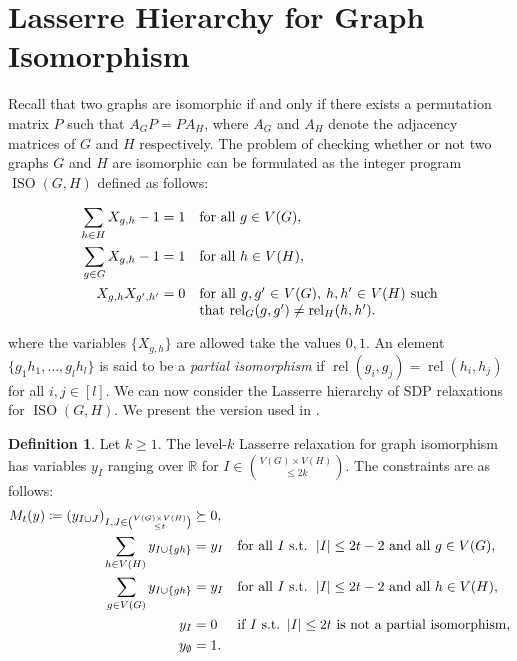 \documentclass[11pt,a4paper]{article}
\theoremstyle{plain}
\theoremstyle{remark}
\theoremstyle{definition}
\newtheorem{definition}[thm]{Definition}
\DeclareMathOperator{\rel}{rel}
\DeclareMathOperator{\iso}{ISO}
\newcommand{\card}[1]{\left\lvert #1 \right\rvert}
\begin{document}
\section{Lasserre Hierarchy for Graph Isomorphism}\label{sec:lasserre}

Recall that two graphs are isomorphic if and only if there exists a permutation matrix $P$ such that $A_G P = P A_H$, where $A_G$ and $A_H$ denote the adjacency matrices of $G$ and $H$ respectively. The problem of checking whether or not two graphs $G$ and $H$ are isomorphic can be formulated as the integer program $\iso(G,H)$ defined as follows: 

\begin{align}
    \begin{aligned}
        \sum_{h \in H} X_{g,h} - 1 & = 1 && \text{for all } g\in V(G), \\
        \sum_{g \in G} X_{g,h} - 1 & = 1 && \text{for all } h\in V(H), \\
        X_{g,h}X_{g',h'} & = 0 && \parbox[t]{6cm}{for all $g,g' \in V(G)$, $h,h' \in V(H)$  such that $\rel_G(g,g') \neq \rel_H(h,h')$.}
    \end{aligned}
\end{align}

where the variables $\{X_{g,h}\}$ are allowed take the values $0,1$. An element $\{g_1h_1, \dots , g_lh_l\}$ is said to be a \emph{partial isomorphism} if $\rel(g_i, g_j) = \rel(h_i, h_j)$ for all $i, j \in [l]$.  We can now consider the Lasserre hierarchy of SDP relaxations for $\iso(G,H)$. We present the version used in \cite{roberson-seppelt-arxiv}. 

\begin{definition}
    Let $k \geq 1$. The level-$k$ Lasserre relaxation for graph isomorphism has variables $y_I$ ranging over $\mathbb{R}$ for $I \in \binom{V(G)\times V(H)} {\leq 2k} $. The constraints are as follows: 
    \begin{align}
        \begin{aligned}
            M_t(y) \coloneqq (y_{I \cup J})_{I, J \in \binom{V(G) \times V(H)}{\leq t}}  &\succeq 0,&& \\
			\sum_{h \in V(H)} y_{I \cup \{gh\}} &= y_{I} &&\text{for all } I \text{ s.t. } \card{I} \leq 2t-2 \text{ and all } g \in V(G), \\
			\sum_{g \in V(G)} y_{I \cup \{gh\}} &= y_{I} && \text{for all } I \text{ s.t. } \card{I} \leq 2t-2 \text{ and all } h \in V(H),  \\
			y_I & = 0 && \text{if } I \text{ s.t.\@ } \card{I} \leq 2t \text{ is not a partial isomorphism,}\\
			y_{\emptyset}& = 1. && \label{lassere5}
        \end{aligned}
    \end{align}
\end{definition}
\end{document}
